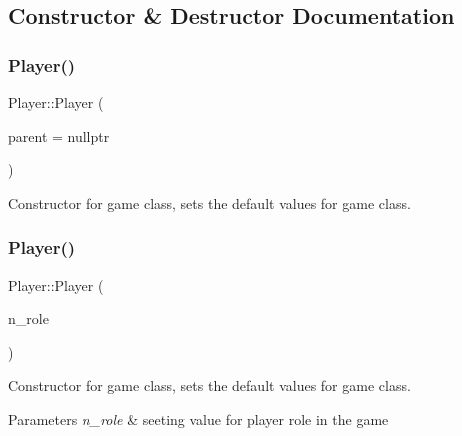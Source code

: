 \subsection{Constructor \& Destructor Documentation}
\mbox{\label{class_player_a1078e29a9779991ea47528d8b31f32ca}} 
\subsubsection{\texorpdfstring{Player()}{Player()}\hspace{0.1cm}{\footnotesize\ttfamily [1/2]}}
{\footnotesize\ttfamily Player\+::\+Player (\begin{DoxyParamCaption}\item[{Q\+Object $\ast$}]{parent = {\ttfamily nullptr} }\end{DoxyParamCaption})\hspace{0.3cm}{\ttfamily [explicit]}}



Constructor for game class, sets the default values for game class. 

\mbox{\label{class_player_a8fd722300bd72d1d043e789e7ed2a39b}} 
\subsubsection{\texorpdfstring{Player()}{Player()}\hspace{0.1cm}{\footnotesize\ttfamily [2/2]}}
{\footnotesize\ttfamily Player\+::\+Player (\begin{DoxyParamCaption}\item[{int}]{n\+\_\+role }\end{DoxyParamCaption})}



Constructor for game class, sets the default values for game class. 


\begin{DoxyParams}{Parameters}
{\em n\+\_\+role} & seeting value for player role in the game \\
\hline
\end{DoxyParams}
\mbox{\label{class_player_a749d2c00e1fe0f5c2746f7505a58c062}} 
